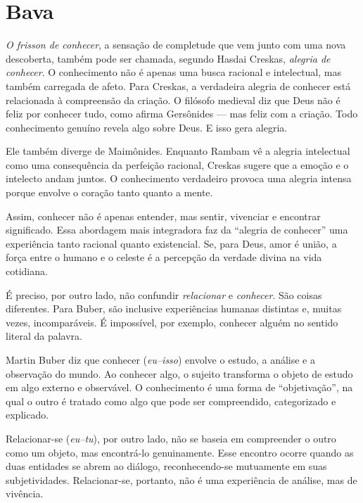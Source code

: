 \chapter*{Bava \smallskip{}}

\textit{O \emph{frisson} de conhecer}, a sensação de completude que vem junto com uma nova descoberta, também pode ser chamada, segundo Hasdai Creskas, \textit{alegria de conhecer}. O conhecimento não é apenas uma busca racional e intelectual, mas também carregada de afeto. Para Creskas, a verdadeira alegria de conhecer está relacionada à compreensão da criação. O filósofo medieval diz que Deus não é feliz por conhecer tudo, como afirma Gersônides --- mas feliz com a criação. Todo conhecimento genuíno revela algo sobre Deus. E isso gera alegria. 

Ele também diverge de Maimônides. Enquanto Rambam vê a alegria intelectual como uma consequência da perfeição racional, Creskas sugere que a emoção e o intelecto andam juntos. O conhecimento verdadeiro provoca uma alegria intensa porque envolve o coração tanto quanto a mente.

Assim, conhecer não é apenas entender, mas sentir, vivenciar e encontrar significado. Essa abordagem mais integradora faz da “alegria de conhecer” uma experiência tanto racional quanto existencial. Se, para Deus, amor é união, a força entre o humano e o celeste é a percepção da verdade divina na vida cotidiana.

É preciso, por outro lado, não confundir \textit{relacionar} e \textit{conhecer}. São coisas diferentes. Para Buber, são inclusive experiências humanas distintas e, muitas vezes, incomparáveis. É impossível, por exemplo, conhecer alguém no sentido literal da palavra.

Martin Buber diz que conhecer (\textit{eu--isso}) envolve o estudo, a análise e a observação do mundo. Ao conhecer algo, o sujeito transforma o objeto de estudo em algo externo e observável. O conhecimento é uma forma de ``objetivação'', na qual o outro é tratado como algo que pode ser compreendido, categorizado e explicado.

Relacionar-se (\textit{eu--tu}), por outro lado, não se baseia em compreender o outro como um objeto, mas encontrá-lo genuinamente. Esse encontro ocorre quando as duas entidades se abrem ao diálogo, reconhecendo-se mutuamente em suas subjetividades. Relacionar-se, portanto, não é uma experiência de análise, mas de vivência.

